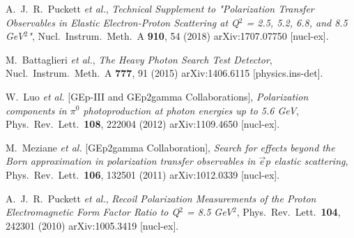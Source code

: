 \documentclass[11pt]{article}
\begin{document}
\begin{thebibliography}{99}
         A.~J.~R.~Puckett {\it et al.},
         \emph{Technical Supplement to "Polarization Transfer Observables in Elastic Electron-Proton Scattering at Q$^2$ = 2.5, 5.2, 6.8, and 8.5 GeV$^2$"},
         Nucl.\ Instrum.\ Meth.\ A {\bf 910}, 54 (2018)
         arXiv:1707.07750 [nucl-ex].

         M.~Battaglieri {\it et al.},
         \emph{The Heavy Photon Search Test Detector},
         Nucl.\ Instrum.\ Meth.\ A {\bf 777}, 91 (2015)
         arXiv:1406.6115 [physics.ins-det].

         W.~Luo {\it et al.} [GEp-III and GEp2gamma Collaborations],
         \emph{Polarization components in $\pi^{0}$ photoproduction at photon energies up to 5.6 GeV},
         Phys.\ Rev.\ Lett.\  {\bf 108}, 222004 (2012)
         arXiv:1109.4650 [nucl-ex].

         M.~Meziane {\it et al.} [GEp2gamma Collaboration],
         \emph{Search for effects beyond the Born approximation in polarization transfer observables in $\vec{e}p$ elastic scattering},
         Phys.\ Rev.\ Lett.\  {\bf 106}, 132501 (2011)
         arXiv:1012.0339 [nucl-ex].

         A.~J.~R.~Puckett {\it et al.},
         \emph{Recoil Polarization Measurements of the Proton Electromagnetic Form Factor Ratio to Q$^2$ = 8.5 GeV$^2$},
         Phys.\ Rev.\ Lett.\  {\bf 104}, 242301 (2010)
         arXiv:1005.3419 [nucl-ex].

    \end{thebibliography}
    \nocite{*}
\end{document}
